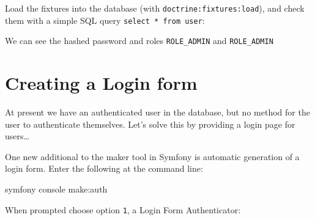 \documentclass[a4paperpaper,openright]{book}
\newenvironment{Shaded}{}{}
\newcommand{\ExtensionTok}[1]{#1}
\newcommand{\FunctionTok}[1]{\textcolor[rgb]{0.02,0.16,0.49}{#1}}
\newcommand{\NormalTok}[1]{#1}
\newcommand{\StringTok}[1]{\textcolor[rgb]{0.25,0.44,0.63}{#1}}
\newcommand{\VariableTok}[1]{\textcolor[rgb]{0.10,0.09,0.49}{#1}}
\begin{document}
Load the fixtures into the database (with
\texttt{doctrine:fixtures:load}), and check them with a simple SQL query
\texttt{select\ *\ from\ user}:

\begin{Shaded}
\end{Shaded}

We can see the hashed password and roles \texttt{ROLE\_ADMIN} and
\texttt{ROLE\_ADMIN}

\hypertarget{creating-a-login-form}{%
\section{Creating a Login form}\label{creating-a-login-form}}

At present we have an authenticated user in the database, but no method
for the user to authenticate themselves. Let's solve this by providing a
login page for users\ldots{}

One new additional to the maker tool in Symfony is automatic generation
of a login form. Enter the following at the command line:

\begin{Shaded}
\begin{Highlighting}[]
    \ExtensionTok{symfony}\NormalTok{ console make:auth}
\end{Highlighting}
\end{Shaded}

When prompted choose option \texttt{1}, a Login Form Authenticator:
\end{document}
